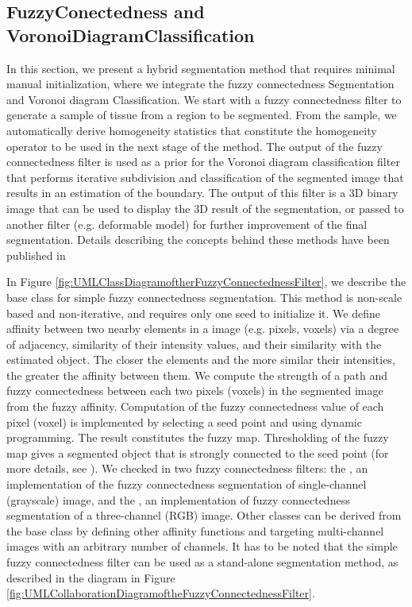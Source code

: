 \subsection{FuzzyConectedness and VoronoiDiagramClassification}
\label{sec:HybridMethod1}
 In this section, we present a hybrid segmentation method that
requires minimal manual initialization, where we integrate the fuzzy
connectedness Segmentation and Voronoi diagram Classification. We
start with a fuzzy connectedness filter to generate a sample of
tissue from a region to be segmented. From the sample, we
automatically derive homogeneity statistics that constitute the
homogeneity operator to be used in the next stage of the method. The
output of the fuzzy  connectedness filter is used as a prior for the
Voronoi diagram classification  filter that performs iterative
subdivision and classification of the segmented image that results in
an estimation of the boundary. The output of this filter is a 3D
binary image that can be used to display the 3D result of the
segmentation, or passed to another filter (e.g. deformable model) for
further improvement of the final segmentation. Details describing the
concepts behind these methods  have been published in
\cite{Angelini2002,Udupa2002,Jin2002,Imielinska2001,Imielinska2000a,Imielinska2000b}

In Figure \ref{fig:UMLClassDiagramoftherFuzzyConnectednessFilter}, we describe 
the base class for simple fuzzy connectedness segmentation. This method is non-scale 
based and non-iterative, and requires only one seed to initialize it. We define affinity 
between two nearby elements in a image (e.g. pixels, voxels) via a degree of adjacency, 
similarity of their intensity values, and their similarity with the estimated object. 
The closer the elements and the more similar their intensities, the greater the affinity between them. We compute the strength of a path and fuzzy connectedness 
between each two pixels (voxels) in the segmented image from the fuzzy affinity. 
Computation of the fuzzy connectedness value of each pixel (voxel) is implemented
by selecting a seed point and using dynamic programming. The result constitutes the fuzzy
map. Thresholding of the fuzzy map gives a segmented object that is strongly connected
to the seed point (for more details, see \cite{Udupa1996}). We checked in two fuzzy 
connectedness filters: the , an
implementation of the fuzzy connectedness segmentation of single-channel (grayscale) 
image, and the , an implementation of fuzzy
connectedness segmentation of a three-channel (RGB) image. Other classes can be derived 
from the base class by defining other affinity functions and targeting multi-channel
images with an arbitrary number of channels. It has to be noted that the simple fuzzy 
connectedness filter can be used as a stand-alone segmentation method,
as described in the diagram in Figure 
\ref{fig:UMLCollaborationDiagramoftheFuzzyConnectednessFilter}.

